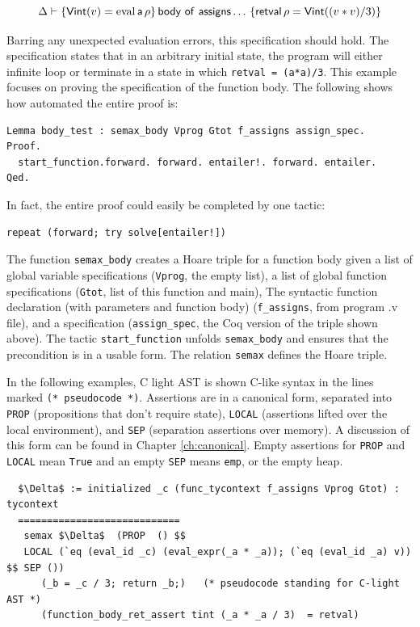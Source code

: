 \documentclass{puthesis}
\begin{document}
\[\Delta \vdash \{\mathsf{Vint}(v)=\mathrm{eval}\,\mathsf{a}\,\rho\}\,\mathsf{body~of~assigns}\ldots\,\{\mathsf{retval}\,\rho = \mathsf{Vint}((v * v) /
3)\}\]

Barring any unexpected evaluation errors, this specification should hold.
The specification states that in an arbitrary initial state, the program will either
infinite loop or terminate in a state in which \lstinline|retval = (a*a)/3|. This
example focuses on proving the specification of the function
body. The following shows
how automated the entire proof is:

\begin{lstlisting}
Lemma body_test : semax_body Vprog Gtot f_assigns assign_spec.
Proof. 
  start_function.forward. forward. entailer!. forward. entailer. 
Qed.
\end{lstlisting}

In fact, the entire proof could easily be completed by one tactic:

\begin{lstlisting}
repeat (forward; try solve[entailer!])
\end{lstlisting}

The function \lstinline|semax_body| creates a Hoare triple for a
function body given a list of global variable specifications
(\lstinline|Vprog|, the empty list), a list of global function
specifications (\lstinline|Gtot|, list of this function and main), The
syntactic function declaration (with parameters and function body)
(\lstinline|f_assigns|, from program .v file), and a
specification (\lstinline|assign_spec|, the Coq version of the triple
shown above). The tactic \lstinline|start_function| unfolds
\lstinline|semax_body| and ensures that the precondition is in a
usable form.  The relation \lstinline|semax| defines the Hoare triple.

In the following examples, C light AST is shown C-like syntax
in the lines marked \lstinline|(* pseudocode *)|. Assertions are in a
canonical form, separated into \lstinline|PROP| (propositions that
don't require state), \lstinline|LOCAL| (assertions lifted over the
local environment), and \lstinline|SEP| (separation assertions over
memory). A discussion of this form can
be found in Chapter \ref{ch:canonical}. Empty assertions for
\lstinline|PROP| and \lstinline|LOCAL| mean \lstinline|True| and an
empty \lstinline|SEP| means \lstinline|emp|, or the empty heap.

\begin{lstlisting}
  $\Delta$ := initialized _c (func_tycontext f_assigns Vprog Gtot) : tycontext
  ============================
   semax $\Delta$  (PROP  () $$ 
   LOCAL (`eq (eval_id _c) (eval_expr(_a * _a)); (`eq (eval_id _a) v)) $$ SEP ()) 
      (_b = _c / 3; return _b;)   (* pseudocode standing for C-light AST *) 
      (function_body_ret_assert tint (_a * _a / 3)  = retval)
\end{lstlisting}
\end{document}

